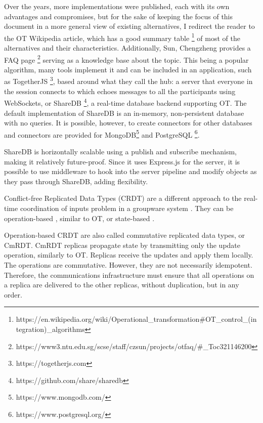 Over the years, more implementations were published, each with its own advantages and compromises, but for the sake of keeping the focus of this document in a more general view of existing alternatives, I redirect the reader to the OT Wikipedia article, which has a good summary table \footnote{https://en.wikipedia.org/wiki/Operational\_transformation\#OT\_control\_(integration)\_algorithms} of most of the alternatives and their characteristics. Additionally, Sun, Chengzheng provides a FAQ page \footnote{https://www3.ntu.edu.sg/scse/staff/czsun/projects/otfaq/\#\_Toc321146200} serving as a knowledge base about the topic. This being a popular algorithm, many tools implement it and can be included in an application, such as TogetherJS \footnote{https://togetherjs.com}, based around what they call the hub: a server that everyone in the session connects to which echoes messages to all the participants using WebSockets, or ShareDB \footnote{https://github.com/share/sharedb}, a real-time database backend supporting OT. The default implementation of ShareDB is an in-memory, non-persistent database with no queries. It is possible, however, to create connectors for other databases and connectors are provided for MongoDB\footnote{https://www.mongodb.com/} and PostgreSQL \footnote{https://www.postgresql.org/}.

ShareDB is horizontally scalable using a publish and subscribe mechanism, making it relatively future-proof. Since it uses Express.js for the server, it is possible to use middleware to hook into the server pipeline and modify objects as they pass through ShareDB, adding flexibility.

Conflict-free Replicated Data Types (CRDT) are a different approach to the real-time coordination of inputs problem in a groupware system \cite{Shapiro2011}. They can be operation-based \cite{Letia2010} \cite{Baquero2014}, similar to OT, or state-based \cite{Baquero1999} \cite{Almeida2014}.

Operation-based CRDT are also called commutative replicated data types, or CmRDT. CmRDT replicas propagate state by transmitting only the update operation, similarly to OT. Replicas receive the updates and apply them locally. The operations are commutative. However, they are not necessarily idempotent. Therefore, the communications infrastructure must ensure that all operations on a replica are delivered to the other replicas, without duplication, but in any order.

